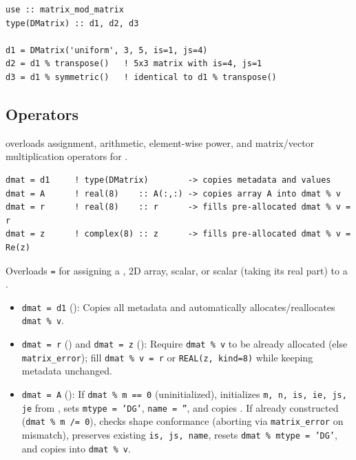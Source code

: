 \lstset{language=[95]Fortran}
\begin{lstlisting}
use :: matrix_mod_matrix
type(DMatrix) :: d1, d2, d3

d1 = DMatrix('uniform', 3, 5, is=1, js=4)
d2 = d1 % transpose()   ! 5x3 matrix with is=4, js=1
d3 = d1 % symmetric()   ! identical to d1 % transpose()
\end{lstlisting}

\subsection{Operators}
\label{subsec:dmat_operators}

 overloads assignment, arithmetic, element-wise power, and matrix/vector multiplication operators for .



\lstset{language=[95]Fortran}
\begin{lstlisting}
dmat = d1     ! type(DMatrix)        -> copies metadata and values
dmat = A      ! real(8)    :: A(:,:) -> copies array A into dmat % v
dmat = r      ! real(8)    :: r      -> fills pre-allocated dmat % v = r
dmat = z      ! complex(8) :: z      -> fills pre-allocated dmat % v = Re(z)
\end{lstlisting}

Overloads \texttt{=} for assigning a , 2D  array,  scalar, or  scalar (taking its real part) to a .

\begin{itemize}
  \item \texttt{dmat = d1} (): Copies all metadata and automatically allocates/reallocates \texttt{dmat \% v}.
  \item \texttt{dmat = r} () and \texttt{dmat = z} (): Require \texttt{dmat \% v} to be already allocated (else \texttt{matrix\_error}); fill \texttt{dmat \% v = r} or \texttt{REAL(z, kind=8)} while keeping metadata unchanged.
  \item \texttt{dmat = A} (): If \texttt{dmat \% m == 0} (uninitialized), initializes \texttt{m, n, is, ie, js, je} from , sets \texttt{mtype = 'DG'}, \texttt{name = ''}, and copies . If already constructed (\texttt{dmat \% m /= 0}), checks shape conformance (aborting via \texttt{matrix\_error} on mismatch), preserves existing \texttt{is, js, name}, resets \texttt{dmat \% mtype = 'DG'}, and copies  into \texttt{dmat \% v}.
\end{itemize}

